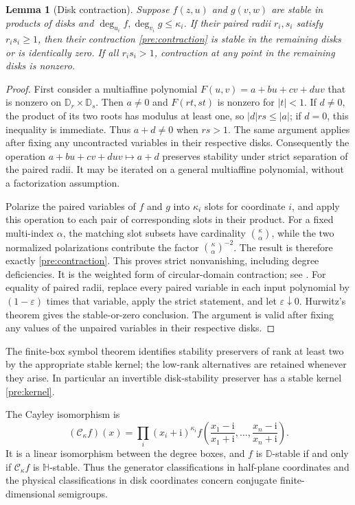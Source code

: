 \documentclass[reqno]{amsart}
\newtheorem{lemma}[theorem]{Lemma}
\theoremstyle{definition}
\theoremstyle{remark}
\newcommand{\D}{\mathbb D}
\newcommand{\HH}{\mathbb H}
\begin{document}
\begin{lemma}[Disk contraction]\label{pre:grace}
Suppose $f(z,u)$ and $g(v,w)$ are stable in products of disks and
$\deg_{u_i}f,\deg_{v_i}g\leq\kappa_i$. If their paired radii
$r_i,s_i$ satisfy $r_is_i\geq1$, then their contraction
\eqref{pre:contraction} is stable in the remaining disks or is identically
zero. If all $r_is_i>1$, contraction at any point in the remaining
disks is nonzero.
\end{lemma}
\begin{proof}
First consider a multiaffine polynomial
$F(u,v)=a+bu+cv+duv$ that is nonzero on $\D_r\times\D_s$.
Then $a\ne0$ and $F(rt,st)$ is nonzero for $|t|<1$.
If $d\ne0$, the product of its two roots has modulus at least one,
so $|d|rs\le|a|$; if $d=0$, this inequality is immediate.
Thus $a+d\ne0$ when $rs>1$.
The same argument applies after fixing any uncontracted variables
in their respective disks. Consequently the operation
$a+bu+cv+duv\mapsto a+d$ preserves stability under strict
separation of the paired radii. It may be iterated on a general
multiaffine polynomial, without a factorization assumption.

Polarize the paired variables of $f$ and $g$ into $\kappa_i$
slots for coordinate $i$, and apply this operation to each pair
of corresponding slots in their product.
For a fixed multi-index $\alpha$, the matching slot subsets have
cardinality $\binom{\kappa}{\alpha}$, while the two normalized
polarizations contribute the factor
$\binom{\kappa}{\alpha}^{-2}$.
The result is therefore exactly \eqref{pre:contraction}.
This proves strict nonvanishing, including degree deficiencies.
It is the weighted form of circular-domain contraction;
see \cite{AsanoJapanese70,BB09,BB10II}.
For equality of paired radii, replace every paired variable in each input
polynomial by $(1-\varepsilon)$ times that variable, apply the strict
statement, and let $\varepsilon\downarrow0$. Hurwitz's theorem gives
the stable-or-zero conclusion. The argument is valid after fixing
any values of the unpaired variables in their respective disks.
\end{proof}

The finite-box symbol theorem \cite{BB09,BB10II} identifies stability
preservers of rank at least two by the appropriate stable kernel;
the low-rank alternatives are retained whenever they arise.
In particular an invertible disk-stability preserver has a stable
kernel \eqref{pre:kernel}. 

The Cayley isomorphism is
\begin{equation}\label{pre:cayley}
 (\mathcal C_\kappa f)(x)
   =\prod_i(x_i+\mathrm i)^{\kappa_i}
      f\left(\frac{x_1-\mathrm i}{x_1+\mathrm i},\ldots,
              \frac{x_n-\mathrm i}{x_n+\mathrm i}\right).
\end{equation}
It is a linear isomorphism between the degree boxes, and $f$ is
$\D$-stable if and only if $\mathcal C_\kappa f$ is $\HH$-stable.
Thus the generator classifications in half-plane coordinates and
the physical classifications in disk coordinates concern conjugate
finite-dimensional semigroups.
\end{document}
